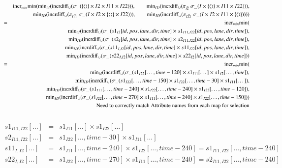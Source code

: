 \begin{eqnarray}
\nonumber &&\algincr_{min} \algmin (\algmin_{id} (\algincrdiff_{\cup} (\sigma_{\dots}(  \{\tuple{} \} \times I2 \times I11 \times I22))) , 
\qquad\algmin_{ID}(\algincrdiff_{\cup} (\pi_{\vec{i2}} \;\sigma_{\dots}(I \times \{\tuple{} \} \times I11 \times I22))) ,\\
\nonumber &&\qquad\algmin_{ID}(\algincrdiff_{\cup} (\pi_{\vec{i11}} \;\sigma_{\dots}(I \times  I2 \times  \{\tuple{} \} \times I22))) , 
\qquad\algmin_{ID}(\algincrdiff_{\cup} (\pi_{\vec{i22}} \;\sigma_{ \dots}(I \times I2 \times I11 \times \{\tuple{} \} ))))\\
&=& 
\algincr_{min} \algmin (\\
\nonumber && \qquad \algmin_{id} (\algincrdiff_{\cup} (\sigma_{\dots} (s1_{I2}[id, pos, lane, dir, time] \times s1_{I11,I22}[id, pos, lane, dir, time]),\\
\nonumber && \qquad \algmin_{ID} (\algincrdiff_{\cup} (\sigma_{\dots} (s2_{I}[id, pos, lane, dir, time] \times s2_{I11,I22}[id, pos, lane, dir, time]), \\
\nonumber && \qquad \algmin_{ID} (\algincrdiff_{\cup} (\sigma_{\dots} (s11_{I,I2} [id, pos, lane, dir, time] \times s11_{I22}[id, pos, lane, dir, time]),\\
\nonumber && \qquad \algmin_{ID} (\algincrdiff_{\cup} (\sigma_{\dots} (s22_{I,I2} [id, pos, lane, dir, time] \times s22_{I2}[id, pos, lane, dir, time]))\\
%
&=&\algincr_{min} \algmin (\\
\nonumber && \qquad \algmin_{id} (\algincrdiff_{\cup} (\sigma_{\dots} (s1_{I22}[\dots, time-120] \times s1_{I11}[\dots] \times s1_{I2}[\dots, time]),\\
\nonumber && \qquad \algmin_{ID} (\algincrdiff_{\cup} (\sigma_{\dots} (s1_{I22}[\dots, time-150] \times s1_{I22}[\dots, time-30] \times s1_{I11}[\dots]), \\
\nonumber && \qquad \algmin_{ID} (\algincrdiff_{\cup} (\sigma_{\dots} (s1_{I11} [\dots, time-240] \times s1_{I22}[\dots, time-240] \times s1_{I22} [\dots, time-120]),\\
\nonumber && \qquad \algmin_{ID} (\algincrdiff_{\cup} (\sigma_{\dots} (s1_{I22} [\dots, time -270] \times s1_{I11}[\dots, time-240] \times s1_{I22}[\dots, time-150]))\\
\nonumber && \mbox{Need to correctly match Attribute names from each map for selection} \\
\nonumber
\end{eqnarray}
\begin{eqnarray}
s1_{I11, I22}[\dots] &=& s1_{I11}[\dots] \times s1_{I22}[\dots] \\
s2_{I11, I22}[\dots] &=& s1_{I22} [\dots, time - 30] \times s1_{I11}[\dots] \\
s11_{I, I2}[\dots] &=& s1_{I11} [\dots, time-240] \times s1_{I22} [\dots, time-240] = s1_{I11, I22}[\dots, time-240]\\
s22_{I, I2} [\dots] &=& s1_{I22} [\dots, time-270] \times s1_{I11} [\dots, time-240] = s2_{I11, I22} [\dots, time-240]
\\\nonumber
\end{eqnarray}
